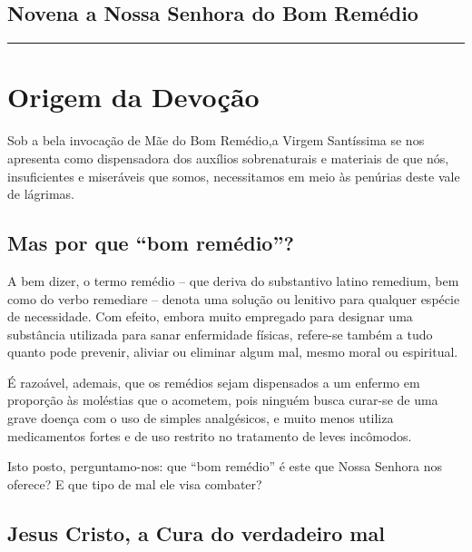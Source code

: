 \documentclass[a4paper,14pt]{extarticle} \usepackage[utf8]{inputenc}
\begin{document}
\subsection*{Novena a Nossa Senhora do Bom Remédio}


\par\noindent\rule{\textwidth}{0.4pt}

\tableofcontents
\thispagestyle{empty}

\newpage

\section{Origem da Devoção}

Sob a bela invocação de Mãe do Bom Remédio,a Virgem Santíssima se nos apresenta como dispensadora dos auxílios sobrenaturais e materiais de que nós, insuficientes e miseráveis que somos, necessitamos em meio às penúrias deste vale de lágrimas.

\subsection{Mas por que “bom remédio”?}

A bem dizer, o termo remédio – que deriva do substantivo latino remedium, bem como do verbo remediare – denota uma solução ou lenitivo para qualquer espécie de necessidade. Com efeito, embora muito empregado para designar uma substância utilizada para sanar enfermidade físicas, refere-se também a tudo quanto pode prevenir, aliviar ou eliminar algum mal, mesmo moral ou espiritual.

É razoável, ademais, que os remédios sejam dispensados a um enfermo em proporção às moléstias que o acometem, pois ninguém busca curar-se de uma grave doença com o uso de simples analgésicos, e muito menos utiliza medicamentos fortes e de uso restrito no tratamento de leves incômodos.

Isto posto, perguntamo-nos: que “bom remédio” é este que Nossa Senhora nos oferece? E que tipo de mal ele visa combater?

\subsection{Jesus Cristo, a Cura do verdadeiro mal}
\end{document}
